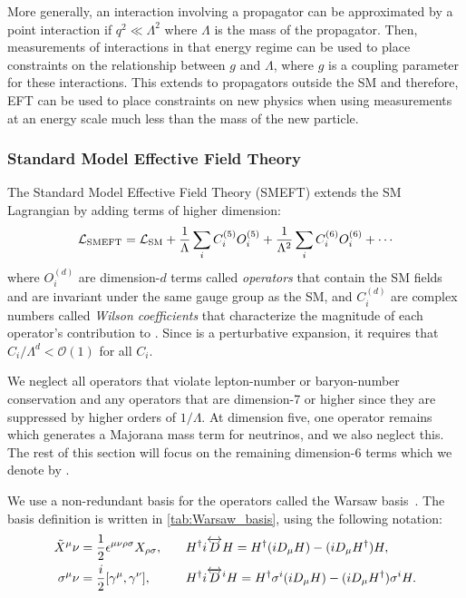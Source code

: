More generally, an interaction involving a propagator can be approximated by a point interaction if $q^2 \ll \Lambda^2$ where $\Lambda$ is the mass of the propagator. Then, measurements of interactions in that energy regime can be used to place constraints on the relationship between $g$ and $\Lambda$, where $g$ is a coupling parameter for these interactions. This extends to propagators outside the SM and therefore, EFT can be used to place constraints on new physics when using measurements at an energy scale much less than the mass of the new particle. 

\subsubsection{Standard Model Effective Field Theory}

The Standard Model Effective Field Theory (SMEFT) extends the SM Lagrangian by adding terms of higher dimension:
\begin{equation}
  \LSMEFT = \LSM + \frac{1}{\Lambda} \sum_i C_i^{(5)} O_i^{(5)} + \frac{1}{\Lambda^2} \sum_i C_i^{(6)} O_i^{(6)} + \cdots
  \label{eq:LSMEFT}
\end{equation}
where $O_i^{(d)}$ are dimension-$d$ terms called \textit{operators} that contain the SM fields and are invariant under the same gauge group as the SM, and $C_i^{(d)}$ are complex numbers called \textit{Wilson coefficients} that characterize the magnitude of each operator's contribution to \LSMEFT. Since \LSMEFT is a perturbative expansion, it requires that $C_i / \Lambda^d < \mathcal{O}(1)$ for all $C_i$.

We neglect all operators that violate lepton-number or baryon-number conservation and any operators that are dimension-7 or higher since they are suppressed by higher orders of $1 / \Lambda$. At dimension five, one operator remains which generates a Majorana mass term for neutrinos, and we also neglect this. The rest of this section will focus on the remaining dimension-6 terms which we denote by \Lsix.

We use a non-redundant basis for the operators called the Warsaw basis~\cite{Grzadkowski:2010es}. The basis definition is written in \cref{tab:Warsaw_basis}, using the following notation:
\begin{align}
  \tilde{X}^\mu\nu &= \frac{1}{2} \epsilon^{\mu\nu\rho\sigma} X_{\rho\sigma}, \quad &&H^\dag i \overleftrightarrow{D} H = H^\dag (i D_\mu H) - (i D_\mu H^\dag) H, \\
  \sigma^\mu\nu &= \frac{i}{2} [\gamma^\mu, \gamma^\nu], &&H^\dag i \overleftrightarrow{D}^i H = H^\dag \sigma^i (i D_\mu H) - (i D_\mu H^\dag) \sigma^i H .
\end{align}

